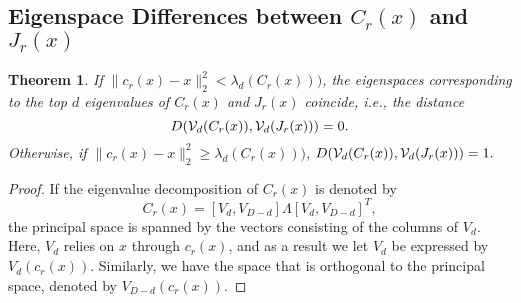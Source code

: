 \documentclass[aos,preprint]{imsart}
\newtheorem{theorem}{Theorem}[section]
\theoremstyle{remark}
\begin{document}
\begin{appendix}
\section{}
\subsection{Eigenspace Differences between $C_r(x)$ and $J_r(x)$}
\begin{theorem}
If $\|c_r(x)-x\|_2^2< \lambda_d(C_r(x)))$, the eigenspaces corresponding to the top $d$ eigenvalues of $C_r(x)$ and $J_r(x)$ coincide, i.e., the distance 
\[
D({\cal V}_d (C_r(x)), {\cal V}_d (J_r(x)))=0.
\]
Otherwise, if $\|c_r(x)-x\|_2^2\geq \lambda_d(C_r(x)))$, 
$
D({\cal V}_d (C_r(x)),{\cal V}_d (J_r(x)))=1.
$
\end{theorem}
\begin{proof}

If the eigenvalue decomposition of $C_r(x)$ is denoted by 
\[
C_r(x) = [ V_d, V_{D-d}] \Lambda [ V_d, V_{D-d}]^T,
\]
the principal space is spanned by the vectors consisting of the columns of $V_d$. Here, $V_d$ relies on $x$ through $c_r(x)$, and as a result we let $V_d$ be expressed by $V_d(c_r(x))$. Similarly, we have the space that is orthogonal to the principal space, denoted by $V_{D-d}(c_r(x))$.


\end{proof}
\end{appendix}
\end{document}
